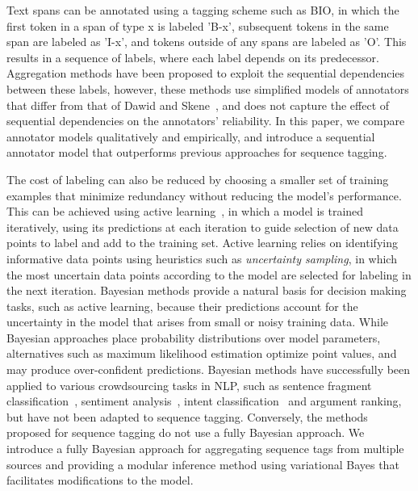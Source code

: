 Text spans can be annotated using a tagging scheme such as BIO, in 
which the first token 
in a span of type x is labeled 'B-x',  subsequent tokens in the same span are labeled as 'I-x', and tokens outside of any spans are labeled as 'O'. 
This results in a sequence of labels, where each label depends on its predecessor.
Aggregation methods have been proposed to exploit the sequential dependencies between these labels\cite{rodrigues2014sequence, nguyen2017aggregating},
however, these methods use simplified models of annotators that differ from 
that of Dawid and Skene~, 
and does not capture the effect of sequential dependencies on the annotators' reliability.
 In this paper, we compare annotator models qualitatively and empirically, 
 and introduce a sequential annotator model that outperforms previous approaches for sequence tagging.

The cost of labeling can also be reduced by choosing a smaller set of training examples 
that minimize redundancy without reducing the model's performance. 
This can be achieved using active learning~\cite{settles2010active}, in which
a model is trained iteratively, using its predictions at each iteration 
to guide selection of new data points to label and add to the training set.
Active learning relies on identifying informative data points
using heuristics such as \emph{uncertainty sampling}, in which the 
most uncertain data points according to the model are selected for labeling in the
next iteration. 
Bayesian methods provide a natural basis for %
decision making tasks, such as active learning,
because their predictions account for the uncertainty in the model that arises from 
small or noisy training data.
While Bayesian approaches place probability distributions over model parameters,
 alternatives such as maximum likelihood estimation optimize point values, and may produce over-confident
 predictions.
Bayesian methods have successfully been applied to various crowdsourcing tasks in NLP, such as
sentence fragment classification~\cite{fang2014active},
sentiment analysis~\cite{levenberg2014predicting,venanzi2014community},
intent classification~\cite{yang2018leveraging}
and argument ranking\cite{simpson2018finding}, 
but have not been adapted to sequence tagging. Conversely, the methods proposed for sequence tagging
\cite{rodrigues2014sequence,nguyen2017aggregating} do not use a fully Bayesian approach.
We introduce a fully Bayesian approach for aggregating sequence tags from multiple sources and  
providing a modular inference method using variational Bayes that facilitates modifications to the model.

